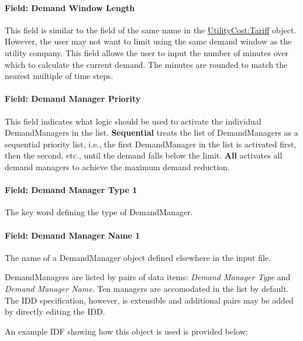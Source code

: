 \paragraph{Field: Demand Window Length}\label{field-demand-window-length}

This field is similar to the field of the same name in the \hyperref[utilitycosttariff]{UtilityCost:Tariff} object. However, the user may not want to limit using the same demand window as the utility company. This field allows the user to input the number of minutes over which to calculate the current demand. The minutes are rounded to match the nearest multiple of time steps.

\paragraph{Field: Demand Manager Priority}\label{field-demand-manager-priority}

This field indicates what logic should be used to activate the individual DemandManagers in the list. \textbf{Sequential} treats the list of DemandManagers as a sequential priority list, i.e., the first DemandManager in the list is activated first, then the second, etc., until the demand falls below the limit. \textbf{All} activates all demand managers to achieve the maximum demand reduction.

\paragraph{Field: Demand Manager Type 1}\label{field-demand-manager-type-1}

The key word defining the type of DemandManager.

\paragraph{Field: Demand Manager Name 1}\label{field-demand-manager-name-1}

The name of a DemandManager object defined elsewhere in the input file.

DemandManagers are listed by pairs of data items: \emph{Demand Manager Type} and \emph{Demand Manager Name}. Ten managers are accomodated in the list by default. The IDD specification, however, is extensible and additional pairs may be added by directly editing the IDD.

An example IDF showing how this object is used is provided below:

